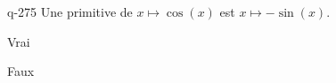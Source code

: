 \begin{truefalse}{q-275}
Une primitive de $x\mapsto \cos(x)$ est $x\mapsto -\sin(x)$.
\item Vrai
\item* Faux
\end{truefalse}

